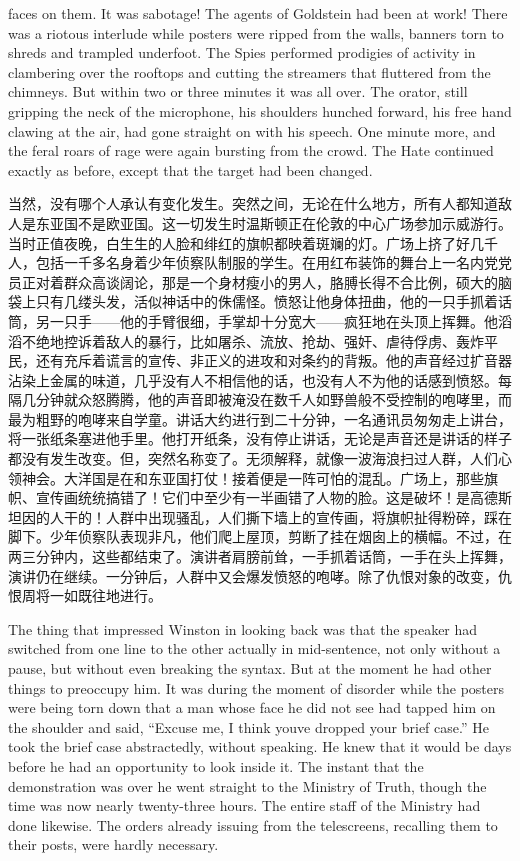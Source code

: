 \begin{paracol}{2}
faces on them. It was sabotage! The agents of Goldstein had been at
work! There was a riotous interlude while posters were ripped from the
walls, banners torn to shreds and trampled underfoot. The Spies
performed prodigies of activity in clambering over the rooftops and
cutting the streamers that fluttered from the chimneys. But within two
or three minutes it was all over. The orator, still gripping the neck of
the microphone, his shoulders hunched forward, his free hand clawing at
the air, had gone straight on with his speech. One minute more, and the
feral roars of rage were again bursting from the crowd. The Hate
continued exactly as before, except that the target had been changed.

\switchcolumn

当然，没有哪个人承认有变化发生。突然之间，无论在什么地方，所有人都知道敌人是东亚国不是欧亚国。这一切发生时温斯顿正在伦敦的中心广场参加示威游行。当时正值夜晚，白生生的人脸和绯红的旗帜都映着斑斓的灯。广场上挤了好几千人，包括一千多名身着少年侦察队制服的学生。在用红布装饰的舞台上一名内党党员正对着群众高谈阔论，那是一个身材瘦小的男人，胳膊长得不合比例，硕大的脑袋上只有几缕头发，活似神话中的侏儒怪。愤怒让他身体扭曲，他的一只手抓着话筒，另一只手——他的手臂很细，手掌却十分宽大——疯狂地在头顶上挥舞。他滔滔不绝地控诉着敌人的暴行，比如屠杀、流放、抢劫、强奸、虐待俘虏、轰炸平民，还有充斥着谎言的宣传、非正义的进攻和对条约的背叛。他的声音经过扩音器沾染上金属的味道，几乎没有人不相信他的话，也没有人不为他的话感到愤怒。每隔几分钟就众怒腾腾，他的声音即被淹没在数千人如野兽般不受控制的咆哮里，而最为粗野的咆哮来自学童。讲话大约进行到二十分钟，一名通讯员匆匆走上讲台，将一张纸条塞进他手里。他打开纸条，没有停止讲话，无论是声音还是讲话的样子都没有发生改变。但，突然名称变了。无须解释，就像一波海浪扫过人群，人们心领神会。大洋国是在和东亚国打仗！接着便是一阵可怕的混乱。广场上，那些旗帜、宣传画统统搞错了！它们中至少有一半画错了人物的脸。这是破坏！是高德斯坦因的人干的！人群中出现骚乱，人们撕下墙上的宣传画，将旗帜扯得粉碎，踩在脚下。少年侦察队表现非凡，他们爬上屋顶，剪断了挂在烟囱上的横幅。不过，在两三分钟内，这些都结束了。演讲者肩膀前耸，一手抓着话筒，一手在头上挥舞，演讲仍在继续。一分钟后，人群中又会爆发愤怒的咆哮。除了仇恨对象的改变，仇恨周将一如既往地进行。

\switchcolumn*

The thing that impressed Winston in looking back was that the speaker
had switched from one line to the other actually in mid-sentence, not
only without a pause, but without even breaking the syntax. But at the
moment he had other things to preoccupy him. It was during the moment of
disorder while the posters were being torn down that a man whose face he
did not see had tapped him on the shoulder and said, ``Excuse me, I think
you\textquotesingle ve dropped your brief case.'' He took the brief case
abstractedly, without speaking. He knew that it would be days before he
had an opportunity to look inside it. The instant that the demonstration
was over he went straight to the Ministry of Truth, though the time was
now nearly twenty-three hours. The entire staff of the Ministry had done
likewise. The orders already issuing from the telescreens, recalling
them to their posts, were hardly necessary.


\end{paracol}
